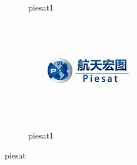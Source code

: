 \documentclass[12pt]{report}
\begin{document}
\begin{figure}
\begin{subfigure}[b]{0.3\textwidth}
        \caption{piesat1}
        \label{piesat2}
    \end{subfigure}
    \begin{subfigure}[b]{0.3\textwidth}
        \centering
        \includegraphics[width=\textwidth]{piesat.jpg}
        \caption{piesat1}
        \label{piesat3}
    \end{subfigure}
    \caption{piesat}
    \label{piesat}
\end{figure}
\end{document}
